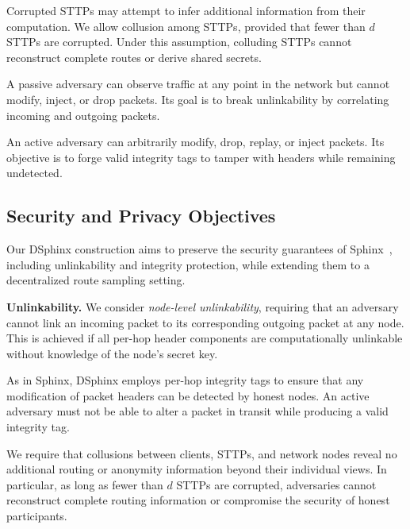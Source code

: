 \smallskip
{}
Corrupted STTPs may attempt to infer additional information from their computation.
We allow collusion among STTPs, provided that fewer than $d$ STTPs are corrupted.
Under this assumption, colluding STTPs cannot reconstruct complete routes or derive shared secrets.

\smallskip
{}
A passive adversary can observe traffic at any point in the network but cannot modify, inject, or drop packets.
Its goal is to break unlinkability by correlating incoming and outgoing packets.

\smallskip
{}
An active adversary can arbitrarily modify, drop, replay, or inject packets.
Its objective is to forge valid integrity tags to tamper with headers while remaining undetected. 



\subsection{Security and Privacy Objectives}\label{sec:sp-objectives}


Our DSphinx construction aims to preserve the security guarantees of Sphinx~\cite{sphinx}, including unlinkability and integrity protection, while extending them to a decentralized route sampling setting.

\smallskip
\noindent\textbf{Unlinkability.} We consider \emph{node-level unlinkability}, requiring that an adversary cannot link an incoming packet to its corresponding outgoing packet at any node. This is achieved if all per-hop header components are computationally unlinkable without knowledge of the node's secret key.

\smallskip
{}
As in Sphinx, DSphinx employs per-hop integrity tags to ensure that any modification of packet headers can be detected by honest nodes.
An active adversary must not be able to alter a packet in transit while producing a valid integrity tag.

\smallskip
{} 
We require that collusions between clients, STTPs, and network nodes reveal no additional routing or anonymity information beyond their individual views. 
In particular, as long as fewer than $d$ STTPs are corrupted, adversaries cannot reconstruct complete routing information or compromise the security of honest participants.
